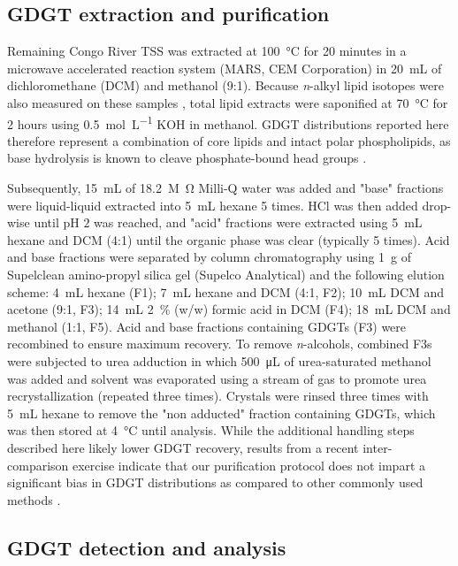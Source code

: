 \subsection{GDGT extraction and purification}

Remaining Congo River TSS was extracted at \SI{100}{\celsius} for 20 minutes in a microwave accelerated reaction system (MARS, CEM Corporation) in \SI{20}{mL} of dichloromethane (DCM) and methanol (9:1). Because \textit{n}-alkyl lipid isotopes were also measured on these samples \citep{Hemingway:2016bq}, total lipid extracts were saponified at \SI{70}{\celsius} for 2 hours using \SI{0.5}{mol.L^{-1}} KOH in methanol. GDGT distributions reported here therefore represent a combination of core lipids and intact polar phospholipids, as base hydrolysis is known to cleave phosphate-bound head groups \citep{Weijers:2011bn}.

Subsequently, \SI{15}{mL} of \SI{18.2}{M \ohm} Milli-Q water was added and "base" fractions were liquid-liquid extracted into \SI{5}{mL} hexane 5 times. HCl was then added drop-wise until pH $2$ was reached, and "acid" fractions were extracted using \SI{5}{mL} hexane and DCM (4:1) until the organic phase was clear (typically 5 times). Acid and base fractions were separated by column chromatography using \SI{1}{g} of Supelclean amino-propyl silica gel (Supelco Analytical) and the following elution scheme: \SI{4}{mL} hexane (F1); \SI{7}{mL} hexane and DCM (4:1, F2); \SI{10}{mL} DCM and acetone (9:1, F3); \SI{14}{mL} \SI{2}{\%} (w/w) formic acid in DCM (F4); \SI{18}{mL} DCM and methanol (1:1, F5). Acid and base fractions containing GDGTs (F3) were recombined to ensure maximum recovery. To remove \textit{n}-alcohols, combined F3s were subjected to urea adduction in which \SI{500}{\micro L} of urea-saturated methanol was added and solvent was evaporated using a stream of  gas to promote urea recrystallization (repeated three times). Crystals were rinsed three times with \SI{5}{mL} hexane to remove the "non adducted" fraction containing GDGTs, which was then stored at \SI{4}{\celsius} until analysis. While the additional handling steps described here likely lower GDGT recovery, results from a recent inter-comparison exercise \citep{Schouten:2013hh} indicate that our purification protocol does not impart a significant bias in GDGT distributions as compared to other commonly used methods \citep[\textit{e.g.} the modified Bligh and Dyer method of][]{Pitcher:2009jd}.

\subsection{GDGT detection and analysis}

